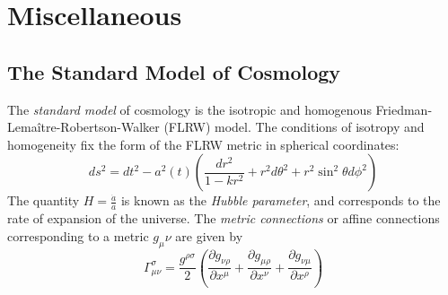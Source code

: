 \chapter{Miscellaneous}
\section{The Standard Model of Cosmology}\label{sec:sm_cosmology}
The \emph{standard model} of cosmology \citep{Bergstrom2004} is the isotropic and homogenous Friedman-Lema\^itre-Robertson-Walker (FLRW) model. The conditions of isotropy and homogeneity fix the form of the FLRW metric in spherical coordinates:
\begin{equation}
ds^2 = dt^2 - a^2(t)\left(\frac{dr^2}{1-kr^2}+r^2d\theta^2+r^2\sin^2\theta d\phi^2\right)
\end{equation}
The quantity $H = \frac{\dot{a}}{a}$ is known as the \emph{Hubble parameter}, and corresponds to the rate of expansion of the universe.
The \emph{metric connections} or affine connections corresponding to a metric $g_\mu\nu$ are given by
\[\Gamma^\sigma_{\mu\nu} = \frac{g^{\rho\sigma}}{2}\left(\frac{\partial g_{\nu\rho}}{\partial x^\mu}+\frac{\partial g_{\mu\rho}}{\partial x^\nu}+\frac{\partial g_{\nu\mu}}{\partial x^\rho}\right)\]
